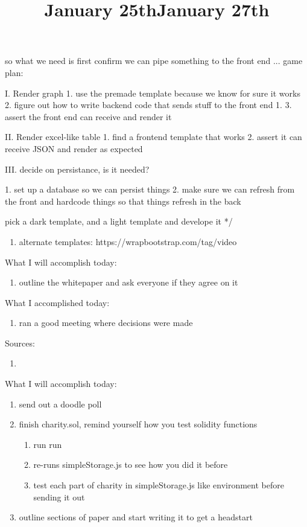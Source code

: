	so what we need is first confirm we can pipe something to the front end ... 
		game plan:
	
		I. Render graph
			1. use the premade template because we know for sure it works
			2. figure out how to write backend code that sends stuff to the front end
					1. 
			3. assert the front end can receive and render it

		II. Render excel-like table
			1. find a frontend template that works
			2. assert it can receive JSON and render as expected

		III. decide on persistance, is it needed?

	1. set up a database so we can persist things
	2. make sure we can refresh from the front and hardcode things so that things refresh in the back

	pick a dark template, and a light template and develope it
*/

\begin{enumerate}
	\item alternate templates: https://wrapbootstrap.com/tag/video
\end{enumerate}	



\title{January 25th}

What I will accomplish today:

\begin{enumerate}
	\item outline the whitepaper and ask everyone if they agree on it
\end{enumerate}


What I accomplished today:

\begin{enumerate}
	\item ran a good meeting where decisions were made
\end{enumerate}

Sources:

\begin{enumerate}
	\item 
\end{enumerate}


\title{January 27th}

What I will accomplish today:

\begin{enumerate}
	\item send out a doodle poll
	\item finish charity.sol, remind yourself how you test solidity functions
		\begin{enumerate}
			\item run run
			\item re-runs simpleStorage.js to see how you did it before
			\item test each part of charity in simpleStorage.js like environment before sending it out
		\end{enumerate}
	\item outline sections of paper and start writing it to get a headstart
\end{enumerate}

